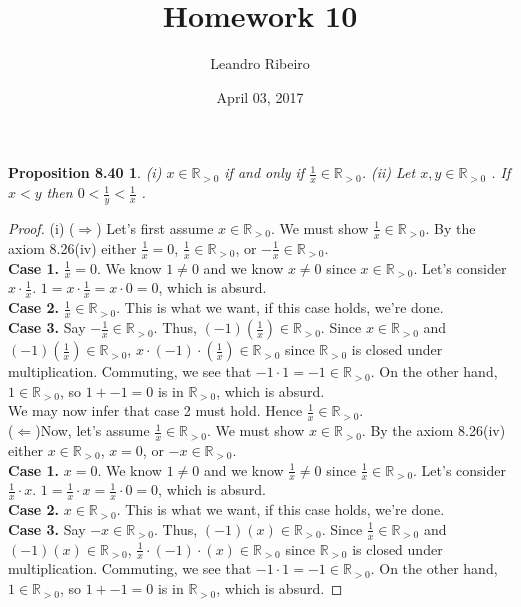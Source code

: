 \documentclass[12pt]{amsart}
\newcommand{\R}{\mathbb{R}}
\begin{document}
\title{Homework 10}
\date{April 03, 2017}
\author{Leandro Ribeiro}

\maketitle

\newtheorem*{prop8.40}{Proposition 8.40}

\begin{prop8.40}
	(i) $x \in \R_{>0}$ if and only if $\frac{1}{x} \in \R_{>0}$.
	\center(ii) Let $x,y \in \R_{>0}$ . If $x < y$ then $0 < \frac{1}{y} < \frac{1}{x}$ .
\end{prop8.40}
\begin{proof}
	
	(i) ($\Rightarrow$) Let's first assume $x \in \R_{>0}$. We must show $\frac{1}{x} \in \R_{>0}$. By the axiom 8.26(iv) either $\frac{1}{x} = 0$, $\frac{1}{x} \in \R_{>0}$, or $-\frac{1}{x} \in \R_{>0}$.
	\\\textbf{Case 1.} $\frac{1}{x} = 0$. We know $1 \neq 0$ and we know $x \neq 0$ since $x \in \R_{>0}$. Let's consider $x \cdot \frac{1}{x}$. $1 = x \cdot \frac{1}{x} = x \cdot 0 = 0$, which is absurd.
	\\\textbf{Case 2.} $\frac{1}{x} \in \R_{>0}$. This is what we want, if this case holds, we're done.
	\\\textbf{Case 3.} Say $-\frac{1}{x} \in \R_{>0}$. Thus, $(-1)(\frac{1}{x}) \in \R_{>0}$. Since $x \in \R_{>0}$ and $(-1)(\frac{1}{x}) \in \R_{>0}$, $x \cdot (-1) \cdot (\frac{1}{x}) \in \R_{>0}$ since $\R_{>0}$ is closed under multiplication. Commuting, we see that $-1 \cdot 1 = -1 \in \R_{>0}$. On the other hand, $1 \in \R_{>0}$, so $1 + -1 = 0$ is in $\R_{>0}$, which is absurd.
	\\\indent We may now infer that case 2 must hold. Hence $\frac{1}{x} \in \R_{>0}$.\\
	\indent($\Leftarrow$)Now, let's assume $\frac{1}{x} \in \R_{>0}$. We must show $x \in \R_{>0}$. By the axiom 8.26(iv) either $x \in \R_{>0}$, $x = 0$, or $-x \in \R_{>0}$.
	\\\textbf{Case 1.} $x = 0$. We know $1 \neq 0$ and we know $\frac{1}{x} \neq 0$ since $\frac{1}{x} \in \R_{>0}$. Let's consider $\frac{1}{x} \cdot x$. $1 = \frac{1}{x} \cdot x = \frac{1}{x} \cdot 0 = 0$, which is absurd.
	\\\textbf{Case 2.} $x \in \R_{>0}$. This is what we want, if this case holds, we're done.
	\\\textbf{Case 3.} Say $-x \in \R_{>0}$. Thus, $(-1)(x) \in \R_{>0}$. Since $\frac{1}{x} \in \R_{>0}$ and $(-1)(x) \in \R_{>0}$, $\frac{1}{x} \cdot (-1) \cdot (x) \in \R_{>0}$ since $\R_{>0}$ is closed under multiplication. Commuting, we see that $-1 \cdot 1 = -1 \in \R_{>0}$. On the other hand, $1 \in \R_{>0}$, so $1 + -1 = 0$ is in $\R_{>0}$, which is absurd.

\end{proof}
\end{document}
